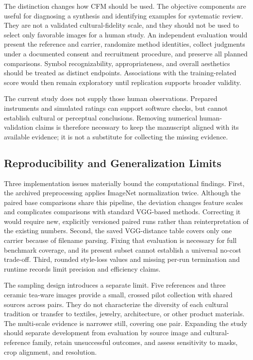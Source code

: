 \documentclass[manuscript,acmlarge,screen,review]{acmart}
\begin{document}
The distinction changes how CFM should be used. The objective components are useful for diagnosing a synthesis and identifying examples for systematic review. They are not a validated cultural-fidelity scale, and they should not be used to select only favorable images for a human study. An independent evaluation would present the reference and carrier, randomize method identities, collect judgments under a documented consent and recruitment procedure, and preserve all planned comparisons. Symbol recognizability, appropriateness, and overall aesthetics should be treated as distinct endpoints. Associations with the training-related score would then remain exploratory until replication supports broader validity.

The current study does not supply those human observations. Prepared instruments and simulated ratings can support software checks, but cannot establish cultural or perceptual conclusions. Removing numerical human-validation claims is therefore necessary to keep the manuscript aligned with its available evidence; it is not a substitute for collecting the missing evidence.

\subsection{Reproducibility and Generalization Limits}
Three implementation issues materially bound the computational findings. First, the archived preprocessing applies ImageNet normalization twice. Although the paired base comparisons share this pipeline, the deviation changes feature scales and complicates comparisons with standard VGG-based methods. Correcting it would require new, explicitly versioned paired runs rather than reinterpretation of the existing numbers. Second, the saved VGG-distance table covers only one carrier because of filename parsing. Fixing that evaluation is necessary for full benchmark coverage, and its present subset cannot establish a universal no-cost trade-off. Third, rounded style-loss values and missing per-run termination and runtime records limit precision and efficiency claims.

The sampling design introduces a separate limit. Five references and three ceramic tea-ware images provide a small, crossed pilot collection with shared sources across pairs. They do not characterize the diversity of each cultural tradition or transfer to textiles, jewelry, architecture, or other product materials. The multi-scale evidence is narrower still, covering one pair. Expanding the study should separate development from evaluation by source image and cultural-reference family, retain unsuccessful outcomes, and assess sensitivity to masks, crop alignment, and resolution.
\end{document}
